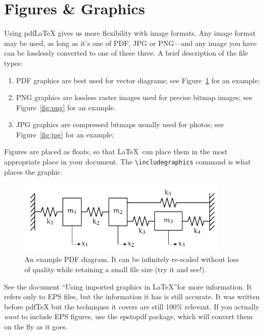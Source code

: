 \documentclass[article]{memoir}
\begin{document}
\chapter*{Figures \& Graphics}

Using pdf\LaTeX{} gives us more flexibility with image formats. Any image format may be used, as long as it's one of PDF, JPG or PNG---and any image you have can be losslessly converted to one of these three. A brief description of the file types:

\begin{enumerate}
  \item{PDF graphics are best used for vector diagrams; see Figure~\ref{fig:pdf} for an example;}
  \item{PNG graphics are lossless raster images used for precise bitmap images; see Figure~\ref{fig:png} for an example.}
  \item{JPG graphics are compressed bitmaps usually used for photos; see Figure~\ref{fig:jpg} for an example;}
\end{enumerate}

Figures are placed as floats, so that \LaTeX\ can place them in the most appropriate place in your document. The \verb|\includegraphics| command is what places the graphic.

\begin{figure}[hbtp]
  \centering 
  \includegraphics[width=0.9\textwidth]{./pdf-example}
  \caption{An example PDF diagram. It can be infinitely re-scaled without loss of quality while retaining a small file size (try it and see!).}
  \label{fig:pdf}
\end{figure}

See the document ``Using imported graphics in \LaTeX{}''\footnotemark for more information. It refers only to EPS files, but the information it has is still accurate. It was written before pdf\TeX{} but the techniques it covers are still 100\% relevant. If you actually \emph{want} to include EPS figures, use the \textsf{epstopdf} package, which will convert them on the fly as it goes.
\end{document}
